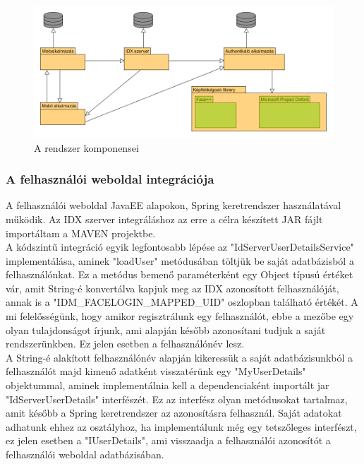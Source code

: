 \begin{figure}[h]
 \begin{minipage}{1\textwidth} 
\centering
    \includegraphics[scale=0.47]{img/rendszerkomponensek}
    \caption{A rendszer komponensei}
 \end{minipage}
\end{figure}


\subsubsection{A felhasználói weboldal integrációja}

A felhasználói weboldal JavaEE alapokon, Spring keretrendszer használatával működik. Az IDX szerver integráláshoz az erre a célra készített JAR fájlt importáltam a MAVEN projektbe.
\\
A kódszintű integráció egyik legfontosabb lépése az "IdServerUserDetailsService" implementálása, aminek "loadUser" metódusában töltjük be saját adatbázisból a felhasználónkat. Ez a metódus bemenő paraméterként egy Object típusú értéket vár, amit String-é konvertálva kapjuk meg az IDX azonosított felhasználóját, annak is a "IDM\_FACELOGIN\_MAPPED\_UID" oszlopban található értékét. A mi felelősségünk, hogy amikor regisztrálunk egy felhasználót, ebbe a mezőbe egy olyan tulajdonságot írjunk, ami alapján később azonosítani tudjuk a saját rendszerünkben. Ez jelen esetben a felhasználónév lesz.
\\A String-é alakított felhasználónév alapján kikeressük a saját adatbázisunkból a felhasználót majd kimenő adatként visszatérünk egy "MyUserDetails" objektummal, aminek implementálnia kell a dependenciaként importált jar "IdServerUserDetails" interfészét. Ez az interfész olyan metódusokat tartalmaz, amit később a Spring keretrendszer az azonosításra felhasznál. Saját adatokat adhatunk ehhez az osztályhoz, ha implementálunk még egy tetszőleges interfészt, ez jelen esetben a "IUserDetails", ami visszaadja a felhasználói azonosítót a felhasználói weboldal adatbázisában.

